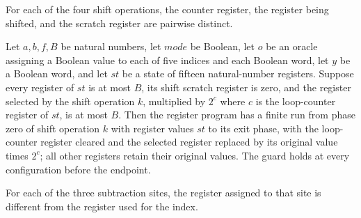 \begin{lemma}
\label{Complexity.PathHard.sh_ne}
\leanok
{}
For each of the four shift operations, the counter register, the register being shifted,
and the scratch register are pairwise distinct.
\end{lemma}

\begin{theorem}
\label{Complexity.PathHard.sh_run}
\leanok
{}
Let $a,b,f,B$ be natural numbers, let $mode$ be Boolean, let $o$ be an oracle assigning
a Boolean value to each of five indices and each Boolean word, let $y$ be a Boolean
word, and let $st$ be a state of fifteen natural-number registers. Suppose every
register of $st$ is at most $B$, its shift scratch register is zero, and the register
selected by the shift operation $k$, multiplied by $2^{c}$ where $c$ is the loop-counter
register of $st$, is at most $B$. Then the register program has a finite run from phase
zero of shift operation $k$ with register values $st$ to its exit phase, with the
loop-counter register cleared and the selected register replaced by its original value
times $2^{c}$; all other registers retain their original values. The guard holds at
every configuration before the endpoint.
\end{theorem}

\begin{lemma}
\label{Complexity.PathHard.sb_ne}
\leanok
{}
For each of the three subtraction sites, the register assigned to that site is different
from the register used for the index.
\end{lemma}

